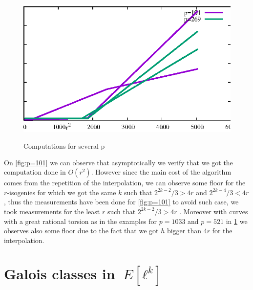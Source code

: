 \documentclass{lms}
\begin{document}
\begin{figure}
\centering\label{fig:several p}
\includegraphics[scale=1]{Code/creat2.eps}
\caption{Computations for several p}
\end{figure}
On \ref{fig:p=101} we can observe that asymptotically we verify that we got the computation done in $O(r^2)$. However since the main cost of the algorithm comes from the repetition of the interpolation, we can observe some floor for the $r$-isogenies for which we got the same $k$ such that $2^{2k-2}/3>4r$ and $2^{2k-4}/3<4r$, thus the measurements have been done for \ref{fig:p=101} to avoid such case, we took measurements for the least $r$ such that $2^{2k-2}/3>4r$ . Moreover with curves with a great rational torsion as in the examples for $p=1033$ and $p=521$ in \ref{fig:several p} we observes also some floor due to the fact that we got $h$ bigger than $4r$ for the interpolation. 





\appendix

\section{Galois classes in~$E[ℓ^k]$}
\label{ap:galois}
\end{document}
